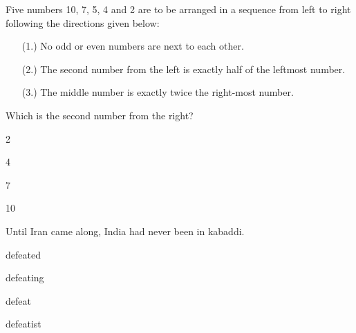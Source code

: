 \bigskip

\item Five numbers 10, 7, 5, 4 and 2 are to be arranged in a sequence from left to right following the directions given below:\\
\begin{enumerate}
    \item[(1.)] No odd or even numbers are next to each other.
    \item[(2.)] The second number from the left is exactly half of the leftmost number.
    \item[(3.)] The middle number is exactly twice the right-most number.
\end{enumerate}
Which is the second number from the right?\\
\begin{enumerate}
\begin{multicols}{4}
    \item 2
    \item 4
    \item 7
    \item 10
    \end{multicols}
\end{enumerate}

\bigskip

\item Until Iran came along, India had never been \underline{\hspace{2cm}} in kabaddi.\\
\begin{enumerate}
\begin{multicols}{4}
    \item defeated
    \item defeating
    \item defeat
    \item defeatist
    \end{multicols}
\end{enumerate}

\bigskip




